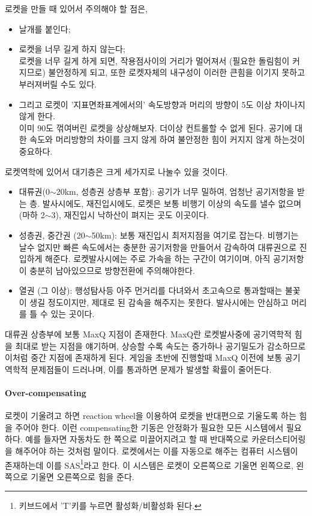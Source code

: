 \documentclass[9pt,twoside,openany]{amsbook}
\begin{document}
로켓을 만들 때 있어서 주의해야 할 점은,
\begin{itemize}
\item 날개를 붙인다;
\item 로켓을 너무 길게 하지 않는다;
\\
로켓을 너무 길게 하게 되면, 작용점사이의 거리가 멀어져서 (필요한 돌림힘이 커지므로) 불안정하게 되고,
또한 로켓자체의 내구성이 이러한 큰힘을 이기지 못하고 부러져버릴 수도 있다.
\item 그리고 로켓이 '지표면좌표계에서의' 속도방향과 머리의 방향이 5도 이상 차이나지 않게 한다.
\\
이미 90도 꺾여버린 로켓을 상상해보자. 더이상 컨트롤할 수 없게 된다. 공기에 대한 속도와 머리방향의 차이를 크지 않게 하여 불안정한 힘이 커지지 않게 하는것이 중요하다.
\end{itemize}

로켓역학에 있어서 대기층은 크게 세가지로 나눌수 있을 것이다.
\begin{itemize}
\item 대류권(0$\sim$20km, 성층권 상층부 포함): 공기가 너무 밀하여, 엄청난 공기저항을 받는 층. 발사시에도, 재진입시에도, 로켓은 보통 비행기 이상의 속도를 낼수 없으며(마하 2$\sim$3), 재진입시 낙하산이 펴지는 곳도 이곳이다.
\item 성층권, 중간권 (20$\sim$50km): 보통 재진입시 최저지점을 여기로 잡는다. 비행기는 날수 없지만 빠른 속도에서는 충분한 공기저항을 만들어서 감속하여 대류권으로 진입하게 해준다. 로켓발사시에는 주로 가속을 하는 구간이 여기이며, 아직 공기저항이 충분히 남아있으므로 방향전환에 주의해야한다.
\item 열권 (그 이상): 행성탐사등 아주 먼거리를 다녀와서 초고속으로 통과할때는 불꽃이 생길 정도이지만, 제대로 된 감속을 해주지는 못한다. 발사시에는 안심하고 머리를 틀 수 있는 곳이다.
\end{itemize}
대류권 상층부에 보통 MaxQ 지점이 존재한다. MaxQ란 로켓발사중에 공기역학적 힘을 최대로 받는 지점을 얘기하며, 상승할 수록 속도는 증가하나 공기밀도가 감소하므로 이처럼 중간 지점에 존재하게 된다. 게임을 초반에 진행할때 MaxQ 이전에 보통 공기역학적 문제점들이 드러나며, 이를 통과하면 문제가 발생할 확률이 줄어든다.

\paragraph{Over-compensating}
로켓이 기울려고 하면 reaction wheel을 이용하여 로켓을 반대편으로 기울도록 하는 힘을 주어야 한다. 
이런 compensating한 기동은 안정화가 필요한 모든 시스템에서 필요하다. 
예를 들자면 자동차도 한 쪽으로 미끌어지려고 할 때 반대쪽으로 카운터스티어링을 해주어야 하는 것처럼 말이다. 
로켓에서는 이를 자동으로 해주는 컴퓨터 시스템이 존재하는데 이를 SAS\footnote{키브드에서 'T'키를 누르면 활성화/비활성화 된다.}라고 한다. 
이 시스템은 로켓이 오른쪽으로 기울면 왼쪽으로, 왼쪽으로 기울면 오른쪽으로 힘을 준다.
\end{document}
